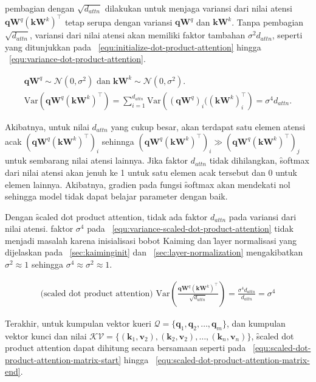	pembagian dengan $\sqrt{d_{attn}}$ dilakukan untuk menjaga variansi dari nilai atensi $\mathbf{q} \mathbf{W}^q (\mathbf{k} \mathbf{W}^k)^{\top}$ tetap serupa dengan variansi $\mathbf{qW}^q$ dan $\mathbf{kW}^k$. Tanpa pembagian $\sqrt{d_{attn}}$, variansi dari nilai atensi akan memiliki faktor tambahan $\sigma^2 d_{attn}$, seperti yang ditunjukkan pada \equ~\ref{equ:initialize-dot-product-attention} hingga \equ~\ref{equ:variance-dot-product-attention}.

	\begin{align}
		\label{equ:initialize-dot-product-attention}
		\mathbf{qW}^q \sim \mathcal{N}(0, \sigma^2) \text{ dan } \mathbf{kW}^k \sim \mathcal{N}(0, \sigma^2). \\
		\label{equ:variance-dot-product-attention}
		\text{Var}(\mathbf{qW}^q (\mathbf{kW}^k)^{\top}) = \sum_{i=1}^{d_{attn}} \text{Var}\left((\mathbf{qW}^q)_i ((\mathbf{kW}^k)^{\top}_i\right) = \sigma^4 d_{attn}.
	\end{align}
	
	Akibatnya, untuk nilai $d_{attn}$ yang cukup besar, akan terdapat satu elemen atensi acak $(\mathbf{qW}^q (\mathbf{kW}^k)^{\top})_i$ sehinnga $(\mathbf{qW}^q (\mathbf{kW}^k)^{\top})_i \gg (\mathbf{qW}^q (\mathbf{kW}^k)^{\top})_j$ untuk sembarang nilai atensi lainnya. Jika faktor $d_{attn}$ tidak dihilangkan, \f{softmax} dari nilai atensi akan jenuh ke 1 untuk satu elemen acak tersebut dan 0 untuk elemen lainnya. Akibatnya, gradien pada fungsi \f{softmax} akan mendekati nol sehingga model tidak dapat belajar parameter dengan baik. 

	Dengan \f{scaled dot product attention}, tidak ada faktor $d_{attn}$ pada variansi dari nilai atensi. faktor $\sigma^4$ pada \equ~\ref{equ:variance-scaled-dot-product-attention} tidak menjadi masalah karena inisialisasi bobot Kaiming dan \f{layer normalisasi} yang dijelaskan pada \sect~\ref{sec:kaiminginit} dan \sect~\ref{sec:layer-normalization} mengakibatkan $\sigma^2 \approx 1$ sehingga $\sigma^4 \approx \sigma^2 \approx 1$.

	\begin{align}
		\label{equ:variance-scaled-dot-product-attention}
		\text{(scaled dot product attention) }\text{Var}\left(\frac{\mathbf{qW}^q (\mathbf{kW}^k)^{\top}}{\sqrt{d_{attn}}}\right) = \frac{\sigma^4 d_{attn}}{d_{attn}} = \sigma^4
	\end{align}

	Terakhir, untuk kumpulan vektor kueri $\mathcal{Q} = \{\mathbf{q}_1, \mathbf{q}_2, \dots, \mathbf{q}_m\}$, dan kumpulan vektor kunci dan nilai $\mathcal{KV} = \{(\mathbf{k}_1, \mathbf{v}_2), (\mathbf{k}_2, \mathbf{v}_2), \dots, (\mathbf{k}_n, \mathbf{v}_n)\}$, \f{scaled dot product attention} dapat dihitung secara bersamaan seperti pada \equ~\ref{equ:scaled-dot-product-attention-matrix-start} hingga \equ~\ref{equ:scaled-dot-product-attention-matrix-end}.


